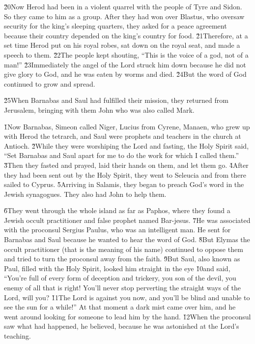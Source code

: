\v{20}Now Herod had been in a violent quarrel with the people of Tyre and Sidon. So they came to him as a group. After they had won over Blastus, who oversaw security for the king's sleeping quarters, they asked for a peace agreement because their country depended on the king's country for food. \v{21}Therefore, at a set time Herod put on his royal robes, sat down on the royal seat, and made a speech to them. \v{22}The people kept shouting, ``This is the voice of a god, not of a man!'' \v{23}Immediately the angel of the Lord struck him down because he did not give glory to God, and he was eaten by worms and died. \v{24}But the word of God continued to grow and spread.

\v{25}When Barnabas and Saul had fulfilled their mission, they returned from Jerusalem, bringing with them John who was also called Mark.

\v{1}Now Barnabas, Simeon called Niger, Lucius from Cyrene, Manaen, who grew up with Herod the tetrarch, and Saul were prophets and teachers in the church at Antioch. \v{2}While they were worshiping the Lord and fasting, the Holy Spirit said, ``Set Barnabas and Saul apart for me to do the work for which I called them.'' \v{3}Then they fasted and prayed, laid their hands on them, and let them go. \v{4}After they had been sent out by the Holy Spirit, they went to Seleucia and from there sailed to Cyprus. \v{5}Arriving in Salamis, they began to preach God's word in the Jewish synagogues. They also had John to help them.

\v{6}They went through the whole island as far as Paphos, where they found a Jewish occult practitioner and false prophet named Bar-jesus. \v{7}He was associated with the proconsul Sergius Paulus, who was an intelligent man. He sent for Barnabas and Saul because he wanted to hear the word of God. \v{8}But Elymas the occult practitioner (that is the meaning of his name) continued to oppose them and tried to turn the proconsul away from the faith. \v{9}But Saul, also known as Paul, filled with the Holy Spirit, looked him straight in the eye \v{10}and said, ``You're full of every form of deception and trickery, you son of the devil, you enemy of all that is right! You'll never stop perverting the straight ways of the Lord, will you? \v{11}The Lord is against you now, and you'll be blind and unable to see the sun for a while!'' At that moment a dark mist came over him, and he went around looking for someone to lead him by the hand. \v{12}When the proconsul saw what had happened, he believed, because he was astonished at the Lord's teaching.


